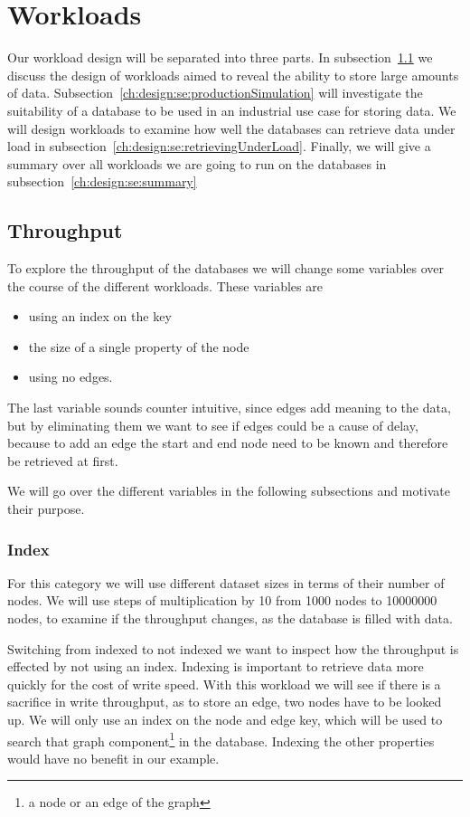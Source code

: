 \section{Workloads}
\label{ch:design:se:workloads}
Our workload design will be separated into three parts.
In subsection~\ref{ch:design:se:throughput} we discuss the design of workloads aimed to reveal the ability to store large amounts of data.
Subsection~\ref{ch:design:se:productionSimulation} will investigate the suitability of a database to be used in an industrial use case for storing data.
We will design workloads to examine how well the databases can retrieve data under load in subsection~\ref{ch:design:se:retrievingUnderLoad}.
Finally,
we will give a summary over all workloads we are going to run on the databases in subsection~\ref{ch:design:se:summary}

\subsection{Throughput}
\label{ch:design:se:throughput}
To explore the throughput of the databases we will change some variables over the course of the different workloads.
These variables are

\begin{itemize}
  \item using an index on the key
  \item the size of a single property of the node
  \item using no edges.
\end{itemize}

The last variable sounds counter intuitive,
since edges add meaning to the data,
but by eliminating them we want to see if edges could be a cause of delay,
because to add an edge the start and end node need to be known and therefore be retrieved at first.

We will go over the different variables in the following subsections and motivate their purpose.

\subsubsection{Index}
\label{ch:design:se:index}
For this category we will use different dataset sizes in terms of their number of nodes.
We will use steps of multiplication by 10 from 1000 nodes to 10000000 nodes,
to examine if the throughput changes,
as the database is filled with data.

Switching from indexed to not indexed we want to inspect how the throughput is effected by not using an index.
Indexing is important to retrieve data more quickly for the cost of write speed.
With this workload we will see if there is a sacrifice in write throughput,
as to store an edge,
two nodes have to be looked up.
We will only use an index on the node and edge key,
which will be used to search that graph component\footnote{a node or an edge of the graph} in the database.
Indexing the other properties would have no benefit in our example.


